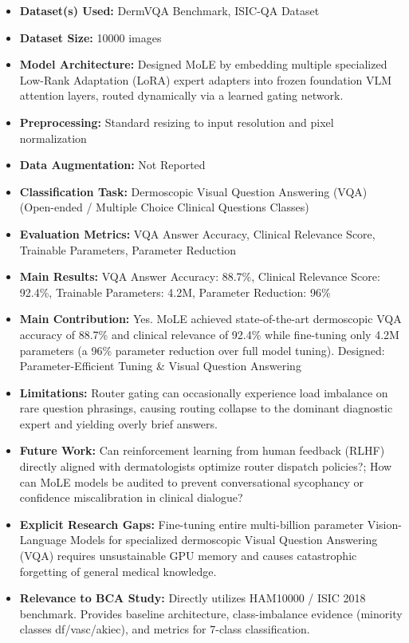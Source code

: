 \documentclass[11pt,a4paper]{article}
\begin{document}
\begin{itemize}\small
\item \textbf{Dataset(s) Used:} DermVQA Benchmark, ISIC-QA Dataset
\item \textbf{Dataset Size:} 10000 images
\item \textbf{Model Architecture:} Designed MoLE by embedding multiple specialized Low-Rank Adaptation (LoRA) expert adapters into frozen foundation VLM attention layers, routed dynamically via a learned gating network.
\item \textbf{Preprocessing:} Standard resizing to input resolution and pixel normalization
\item \textbf{Data Augmentation:} Not Reported
\item \textbf{Classification Task:} Dermoscopic Visual Question Answering (VQA) (Open-ended / Multiple Choice Clinical Questions Classes)
\item \textbf{Evaluation Metrics:} VQA Answer Accuracy, Clinical Relevance Score, Trainable Parameters, Parameter Reduction
\item \textbf{Main Results:} VQA Answer Accuracy: 88.7\%, Clinical Relevance Score: 92.4\%, Trainable Parameters: 4.2M, Parameter Reduction: 96\%
\item \textbf{Main Contribution:} Yes. MoLE achieved state-of-the-art dermoscopic VQA accuracy of 88.7\% and clinical relevance of 92.4\% while fine-tuning only 4.2M parameters (a 96\% parameter reduction over full model tuning). Designed: Parameter-Efficient Tuning \& Visual Question Answering
\item \textbf{Limitations:} Router gating can occasionally experience load imbalance on rare question phrasings, causing routing collapse to the dominant diagnostic expert and yielding overly brief answers.
\item \textbf{Future Work:} Can reinforcement learning from human feedback (RLHF) directly aligned with dermatologists optimize router dispatch policies?; How can MoLE models be audited to prevent conversational sycophancy or confidence miscalibration in clinical dialogue?
\item \textbf{Explicit Research Gaps:} Fine-tuning entire multi-billion parameter Vision-Language Models for specialized dermoscopic Visual Question Answering (VQA) requires unsustainable GPU memory and causes catastrophic forgetting of general medical knowledge.
\item \textbf{Relevance to BCA Study:} Directly utilizes HAM10000 / ISIC 2018 benchmark. Provides baseline architecture, class-imbalance evidence (minority classes df/vasc/akiec), and metrics for 7-class classification.
\end{itemize}
\end{document}
